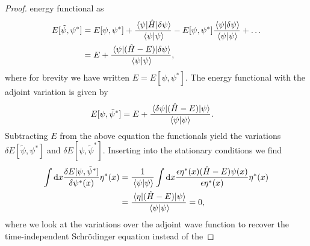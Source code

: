 \begin{proof}
            energy functional as
            \begin{align}
                E[\tilde{\psi}, \psi^{*}]
                &=
                E[\psi, \psi^{*}]
                + \frac{
                    \mel*{\psi}{\hat{H}}{\delta\psi}
                }{
                    \braket*{\psi}
                }
                - E[\psi, \psi^{*}]
                \frac{
                    \braket*{\psi}{\delta\psi}
                }{
                    \braket*{\psi}
                }
                + \dots
                \\
                &=
                E + \frac{
                    \mel*{\psi}{(\hat{H} - E)}{\delta\psi}
                }{
                    \braket*{\psi}
                },
            \end{align}
            where for brevity we have written $E = E[\psi, \psi^{*}]$.
            The energy functional with the adjoint variation is given by
            \begin{align}
                E[\psi, \tilde{\psi}^{*}]
                &=
                E + \frac{
                    \mel{\delta\psi}{(\hat{H}- E)}{\psi}
                }{
                    \braket{\psi}
                }.
            \end{align}
            Subtracting $E$ from the above equation the functionals yield the
            variations $\delta E[\tilde{\psi}, \psi^{*}]$ and $\delta E[\psi,
            \tilde{\psi}^{*}]$.
            Inserting into the stationary conditions we find
            \begin{align}
                \int\dd x
                \frac{
                    \delta E[\psi, \tilde{\psi}^{*}]
                }{
                    \delta\psi^{*}(x)
                }\eta^{*}(x)
                &=
                \frac{1}{\braket*{\psi}}
                \int\dd x
                \frac{
                    \epsilon\eta^{*}(x)(
                        \hat{H}
                        - E
                    )
                    \psi(x)
                }{
                    \epsilon\eta^{*}(x)
                }
                \eta^{*}(x)
                \\
                &=
                \frac{
                    \mel*{\eta}{(\hat{H} - E)}{\psi}
                }{
                    \braket*{\psi}
                }
                = 0,
            \end{align}
            where we look at the variations over the adjoint wave function to
            recover the time-independent Schrödinger equation instead of the

\end{proof}
